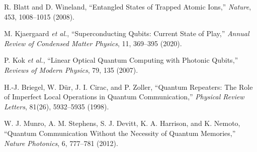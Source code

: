 \documentclass[11pt]{article}
\begin{document}
\begin{thebibliography}{99}
 R. Blatt and D. Wineland, ``Entangled States of Trapped Atomic Ions,'' \emph{Nature}, 453, 1008–1015 (2008).

 M. Kjaergaard \emph{et al.}, ``Superconducting Qubits: Current State of Play,'' \emph{Annual Review of Condensed Matter Physics}, 11, 369–395 (2020).

 P. Kok \emph{et al.}, ``Linear Optical Quantum Computing with Photonic Qubits,'' \emph{Reviews of Modern Physics}, 79, 135 (2007).

 H.-J. Briegel, W. D\"ur, J. I. Cirac, and P. Zoller, ``Quantum Repeaters: The Role of Imperfect Local Operations in Quantum Communication,'' \emph{Physical Review Letters}, 81(26), 5932–5935 (1998).

 W. J. Munro, A. M. Stephens, S. J. Devitt, K. A. Harrison, and K. Nemoto, ``Quantum Communication Without the Necessity of Quantum Memories,'' \emph{Nature Photonics}, 6, 777–781 (2012).
\end{thebibliography}
\end{document}
